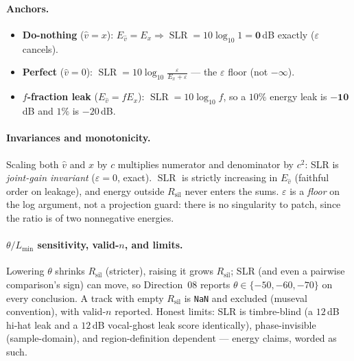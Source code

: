 \documentclass[11pt]{article}
\newcommand{\code}[1]{\texttt{#1}}
\DeclareMathOperator{\SLR}{SLR}
\newcommand{\eps}{\varepsilon}
\newcommand{\vhat}{\hat v}
\newcommand{\Rsil}{R_{\text{sil}}}
\begin{document}
\paragraph{Anchors.}
\begin{itemize}
\item \textbf{Do-nothing} ($\vhat=x$): $E_{\vhat}=E_x \Rightarrow \SLR = 10\log_{10}1 =
      \mathbf{0}$\,dB exactly ($\eps$ cancels).
\item \textbf{Perfect} ($\vhat=0$): $\SLR = 10\log_{10}\frac{\eps}{E_x+\eps}$ --- the $\eps$
      floor (not $-\infty$).
\item \textbf{$f$-fraction leak} ($E_{\vhat}=fE_x$): $\SLR = 10\log_{10} f$, so a $10\%$
      energy leak is $\mathbf{-10}$\,dB and $1\%$ is $-20$\,dB.
\end{itemize}

\paragraph{Invariances and monotonicity.} Scaling both $\vhat$ and $x$ by $c$ multiplies
numerator and denominator by $c^2$: SLR is \emph{joint-gain invariant} ($\eps=0$, exact).
$\SLR$ is strictly increasing in $E_{\vhat}$ (faithful order on leakage), and energy outside
$\Rsil$ never enters the sums. $\eps$ is a \emph{floor} on the log argument, not a
projection guard: there is no singularity to patch, since the ratio is of two nonnegative
energies.

\paragraph{$\theta/L_{\min}$ sensitivity, valid-$n$, and limits.} Lowering $\theta$ shrinks
$\Rsil$ (stricter), raising it grows $\Rsil$; SLR (and even a pairwise comparison's sign)
can move, so Direction~08 reports $\theta\in\{-50,-60,-70\}$ on every conclusion. A track
with empty $\Rsil$ is \code{NaN} and excluded (museval convention), with valid-$n$ reported.
Honest limits: SLR is timbre-blind (a $12$\,dB hi-hat leak and a $12$\,dB vocal-ghost leak
score identically), phase-invisible (sample-domain), and region-definition dependent ---
energy claims, worded as such.
\end{document}
